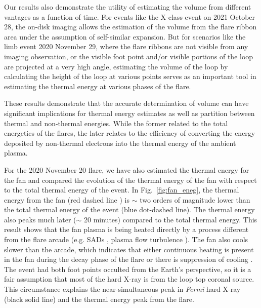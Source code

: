 Our results also demonstrate the utility of estimating the volume from different vantages as a function of time. For events like the X-class event on 2021 October 28, the on-disk imaging allows the estimation of the volume from the flare ribbon area under the assumption of self-similar expansion. But for scenarios like the limb event 2020 November 29, where the flare ribbons are not visible from any imaging observation, or the visible foot point and/or visible portions of the loop are projected at a very high angle, estimating the volume of the loop by calculating the height of the loop at various points serves as an important tool in estimating the thermal energy at various phases of the flare. 

These results demonstrate that the accurate determination of volume can have significant implications for thermal energy estimates as well as partition between thermal and non-thermal energies.  While the former related to the total energetics of the flares, the later relates to the efficiency of converting the energy deposited by non-thermal electrons into the thermal energy of the ambient plasma. 


For the 2020 November 20 flare, we have also estimated the thermal energy for the fan and compared the evolution of the thermal energy of the fan with respect to the total thermal energy of the event. %
In Fig.~\ref{fig:fan_eneg}, the thermal energy from the fan (red dashed line ) is $\sim$ two orders of magnitude lower than the total thermal energy of the event (blue dot-dashed line). The thermal energy also peaks much later ($\sim$ 20 minutes) compared to the total thermal energy. This result shows that the fan plasma is being heated directly by a process different from the flare arcade (e.g. SADs \citep{reeves17}, plasma flow turbulence \citep{xie23}). The fan also cools slower than the arcade, which indicates that either continuous heating is present in the fan during the decay phase of the flare or there is suppression of cooling \citep[e.g.][]{xie23}. The event had both foot points occulted from the Earth's perspective, so it is a fair assumption that most of the hard X-ray is from the loop top coronal source. This circumstance explains the near-simultaneous peak in {\it Fermi} hard X-ray (black solid line) and the thermal energy peak from the flare.

